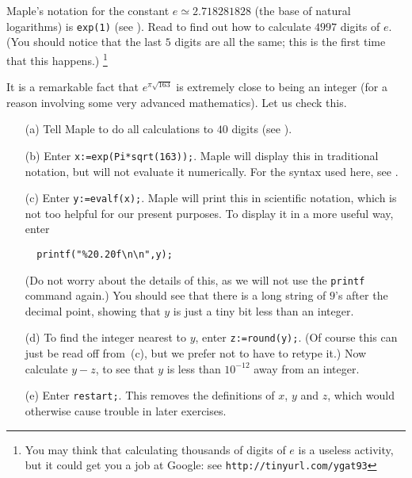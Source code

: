 \documentclass[a4paper,10pt]{amsbook}
\numberwithin{example}{chapter}
\begin{document}
\begin{exercise}\label{ex-e-digits}
 Maple's notation for the constant $e\simeq 2.718281828$ (the base of
 natural logarithms) is \verb~exp(1)~  (see
 \note{\NOTEexp}).  Read \note{\NOTEevalfdigits,\NOTEdigits} to find out
 how to calculate $4997$ digits of $e$.  (You should notice
 that the last $5$ digits are all the same; this is the first time
 that this happens.) 
 \footnote{You may think that calculating thousands of digits of $e$
 is a useless activity, but it could get you a job at Google: see
 \verb~http://tinyurl.com/ygat93~
 }
\end{exercise}

\begin{exercise}\label{ex-near-int}
 It is a remarkable fact that $e^{\pi\sqrt{163}}$ is extremely close
 to being an integer (for a reason involving some very advanced
 mathematics).  Let us check this. 
 \begin{itemize}
  \item[(a)] Tell Maple to do all calculations to $40$
   digits (see \note{\NOTEdigits}).
  \item[(b)] Enter \verb~x:=exp(Pi*sqrt(163));~.  Maple will
   display this in traditional notation, but will not evaluate it
   numerically.  For the syntax used here, see
   \note{\NOTEcolonequals,\NOTEexp,\NOTEpi,\NOTEsqrt}. 
  \item[(c)] Enter \verb~y:=evalf(x);~.  Maple will print this in
   scientific notation, which is not too helpful for our present
   purposes.  To display it in a more useful way, enter
\begin{verbatim}
  printf("%20.20f\n\n",y);
\end{verbatim}
   (Do not worry about the details of this, as we will not
   use the \verb~printf~ command again.)  You should see
   that there is a long string of $9$'s after the decimal
   point, showing that $y$ is just a tiny bit less than an
   integer. 
  \item[(d)] To find the integer nearest to $y$, enter
   \verb~z:=round(y);~.  (Of course this can just be read off
   from~(c), but we prefer not to have to retype it.)  Now calculate
   $y-z$, to see that $y$ is less than $10^{-12}$ away from an
   integer. 
  \item[(e)] Enter \verb~restart;~.  This removes the definitions of
   $x$, $y$ and $z$, which would otherwise cause trouble in later
   exercises. 
 \end{itemize}
\end{exercise}
\end{document}
